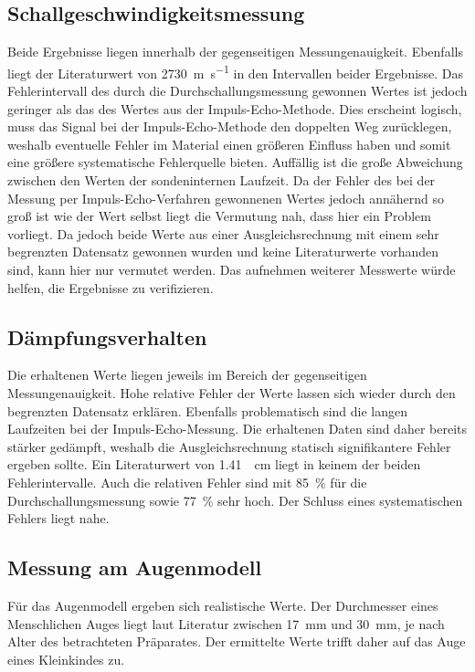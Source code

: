 \subsection{Schallgeschwindigkeitsmessung}
Beide Ergebnisse liegen innerhalb der gegenseitigen Messungenauigkeit. Ebenfalls liegt
der Literaturwert\cite{acryl} von \SI[per-mode=reciprocal]{2730}{\metre\per\second} in den Intervallen
beider Ergebnisse. Das Fehlerintervall des durch die Durchschallungsmessung gewonnen Wertes
ist jedoch geringer als das des Wertes aus der Impuls-Echo-Methode. Dies erscheint logisch,
muss das Signal bei der Impuls-Echo-Methode den doppelten Weg zurücklegen, weshalb eventuelle
Fehler im Material einen größeren Einfluss haben und somit eine größere systematische
Fehlerquelle bieten. Auffällig ist die große Abweichung zwischen den Werten der sondeninternen
Laufzeit. Da der Fehler des bei der Messung per Impuls-Echo-Verfahren gewonnenen Wertes
jedoch annähernd so groß ist wie der Wert selbst liegt die Vermutung nah, dass hier ein
Problem vorliegt. Da jedoch beide Werte aus einer Ausgleichsrechnung mit einem sehr
begrenzten Datensatz gewonnen wurden und keine Literaturwerte vorhanden sind, kann hier nur
vermutet werden. Das aufnehmen weiterer Messwerte würde helfen, die Ergebnisse zu verifizieren.
\subsection{Dämpfungsverhalten}
Die erhaltenen Werte liegen jeweils im Bereich der gegenseitigen Messungenauigkeit.
Hohe relative Fehler der Werte lassen sich wieder durch den begrenzten Datensatz
erklären. Ebenfalls problematisch sind die langen Laufzeiten bei der Impuls-Echo-Messung.
Die erhaltenen Daten sind daher bereits stärker gedämpft, weshalb die Ausgleichsrechnung
statisch signifikantere Fehler ergeben sollte. Ein Literaturwert\cite{daempf} von \SI{1.41}{\per\centi\metre}
liegt in keinem der beiden Fehlerintervalle. Auch die relativen Fehler sind mit \SI{85}{\percent}
für die Durchschallungsmessung sowie \SI{77}{\percent} sehr hoch. Der Schluss eines
systematischen Fehlers liegt nahe.
\subsection{Messung am Augenmodell}
Für das Augenmodell ergeben sich realistische Werte. Der Durchmesser eines Menschlichen
Auges liegt laut Literatur\cite{auge} zwischen \SI{17}{\milli\metre} und \SI{30}{\milli\metre},
je nach Alter des betrachteten Präparates. Der ermittelte Werte trifft daher auf das Auge eines
Kleinkindes zu.
